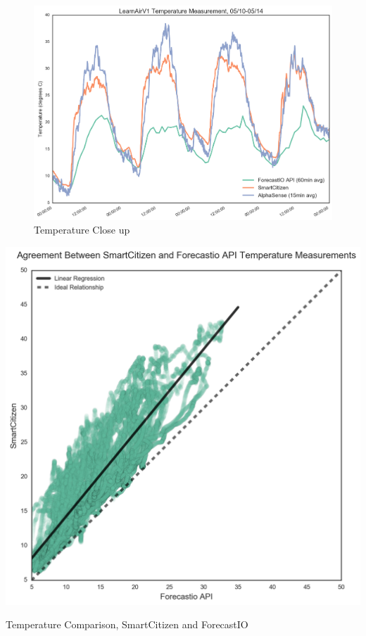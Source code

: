 \begin{figure}[htb]
 	\includegraphics[width=\textwidth]{figs/temp_zoomed}               
 	 \caption{Temperature Close up}
  	\label{fig:temp_zoomed}
\end{figure}

\begin{marginfigure}[3.5cm]
 	\includegraphics[width=\textwidth]{figs/temp_forecastio_v_sck}               
 	 \caption{Temperature Comparison, SmartCitizen and ForecastIO}
  	\label{fig:temp_forecastio_v_sck}
\end{marginfigure}

